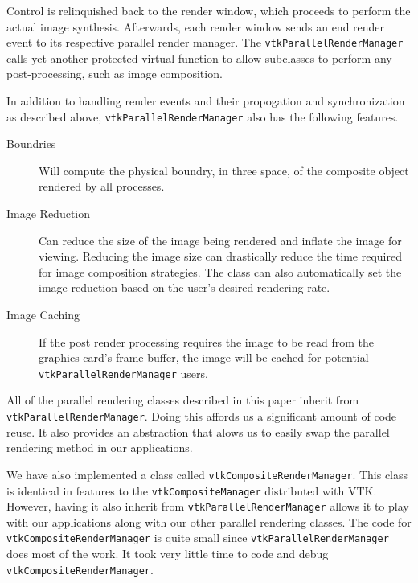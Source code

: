 \documentclass[twocolumn]{article}
\newcommand{\cidentifier}[1]{\texttt{#1}}
\begin{document}
  Control is relinquished back to the render window, which proceeds to
  perform the actual image synthesis.  Afterwards, each render window sends
  an end render event to its respective parallel render manager.  The
  \cidentifier{vtk\-Parallel\-Render\-Manager} calls yet another protected
  virtual function to allow subclasses to perform any post-processing, such
  as image composition.

  In addition to handling render events and their propogation and
  synchronization as described above,
  \cidentifier{vtk\-Parallel\-Render\-Manager} also has the following
  features.
  \begin{description}
    \item [Boundries] Will compute the physical boundry, in three space, of
      the composite object rendered by all processes.
    \item [Image Reduction] Can reduce the size of the image being rendered
      and inflate the image for viewing.  Reducing the image size can
      drastically reduce the time required for image composition
      strategies.  The class can also automatically set the image reduction
      based on the user's desired rendering rate.
    \item [Image Caching] If the post render processing requires the image
      to be read from the graphics card's frame buffer, the image will be
      cached for potential \cidentifier{vtk\-Parallel\-Render\-Manager}
      users.
  \end{description}

  All of the parallel rendering classes described in this paper inherit
  from \cidentifier{vtk\-Parallel\-Render\-Manager}.  Doing this affords us
  a significant amount of code reuse.  It also provides an abstraction that
  alows us to easily swap the parallel rendering method in our
  applications.

  We have also implemented a class called
  \cidentifier{vtk\-Composite\-Render\-Manager}.  This class is identical
  in features to the \cidentifier{vtk\-Composite\-Manager} distributed with
  VTK.  However, having it also inherit from
  \cidentifier{vtk\-Parallel\-Render\-Manager} allows it to play with our
  applications along with our other parallel rendering classes.  The code
  for \cidentifier{vtk\-Composite\-Render\-Manager} is quite small since
  \cidentifier{vtk\-Parallel\-Render\-Manager} does most of the work.  It
  took very little time to code and debug
  \cidentifier{vtk\-Composite\-Render\-Manager}.
\end{document}
